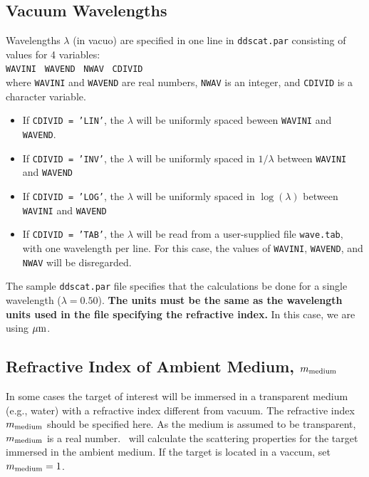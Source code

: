 \subsection{ Vacuum Wavelengths}
Wavelengths $\lambda$ (in vacuo) are specified in one line in {\tt ddscat.par}
consisting of values for 4 variables:\\
 
{\tt WAVINI}~ {\tt WAVEND}~ {\tt NWAV}~ {\tt CDIVID}\\
where {\tt WAVINI} and {\tt WAVEND} are real numbers, {\tt NWAV} is an
integer, 
and {\tt CDIVID} is a character variable.
\begin{itemize}
\item If {\tt CDIVID = 'LIN'}, the $\lambda$ will be uniformly spaced
beween {\tt WAVINI} and {\tt WAVEND}.
\item If {\tt CDIVID = 'INV'}, the $\lambda$ will be uniformly spaced in
$1/\lambda$ between {\tt WAVINI} and {\tt WAVEND}
\item If {\tt CDIVID = 'LOG'}, the $\lambda$ will be uniformly spaced
in $\log(\lambda)$ between {\tt WAVINI} and {\tt WAVEND}
\item If {\tt CDIVID = 'TAB'}, the $\lambda$ will be read from a
user-supplied file {\tt wave.tab}, with one wavelength per line.
For this case, the values of {\tt WAVINI}, {\tt WAVEND}, 
and {\tt NWAV} will be disregarded.
\end{itemize}
The sample {\tt ddscat.par} file specifies that the calculations be done for a
single wavelength ($\lambda=0.50$).  
{\bf The units must be the same as the wavelength
units used in the file specifying the refractive index.}  In this case,
we are using ${\mu{\rm m}}$.

\subsection{\label{sec:nambient} 
            Refractive Index of Ambient Medium, $m_{\rm medium}$}


In some cases the target of interest will be immersed in a transparent
medium (e.g., water) with a refractive index different from vacuum.
The refractive index $m_{\rm medium}$ should be specified here.  As the
medium is assumed to be transparent, $m_{\rm medium}$ is a real number.
\ddscat\ will calculate the scattering properties for the target
immersed in the ambient medium.
If the target is located in a vaccum, set $m_{\rm medium}=1$.

